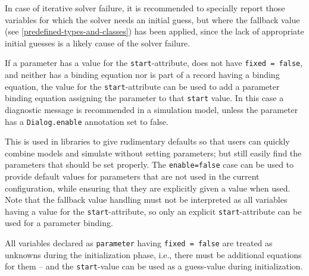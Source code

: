 \begin{nonnormative}
In case of iterative solver failure, it is recommended to specially report those variables for which the solver needs an initial guess, but where the fallback value (see \cref{predefined-types-and-classes}) has been applied, since the lack of appropriate initial guesses is a likely cause of the solver failure.
\end{nonnormative}

If a parameter has a value for the \lstinline!start!-attribute, does not have \lstinline!fixed = false!, and neither has a binding equation nor is part of a record having a binding equation, the value for the \lstinline!start!-attribute can be used to add a parameter binding equation assigning the parameter to that \lstinline!start! value.
In this case a diagnostic message is recommended in a simulation model, unless the parameter has a \lstinline!Dialog.enable! annotation set to false.

\begin{nonnormative}
This is used in libraries to give rudimentary defaults so that users can quickly combine models and simulate without setting parameters; but still easily find the parameters that should be set properly.
The \lstinline!enable=false! case can be used to provide default values for parameters that are not used in the current configuration, while ensuring that they are explicitly given a value when used.
Note that the fallback value handling must not be interpreted as all variables having a value for the \lstinline!start!-attribute, so only an explicit \lstinline!start!-attribute can be used for a parameter binding.
\end{nonnormative}

All variables declared as \lstinline!parameter! having \lstinline!fixed = false! are treated as unknowns during the initialization phase, i.e., there must be additional equations for them -- and the \lstinline!start!-value can be used as a guess-value during initialization.

